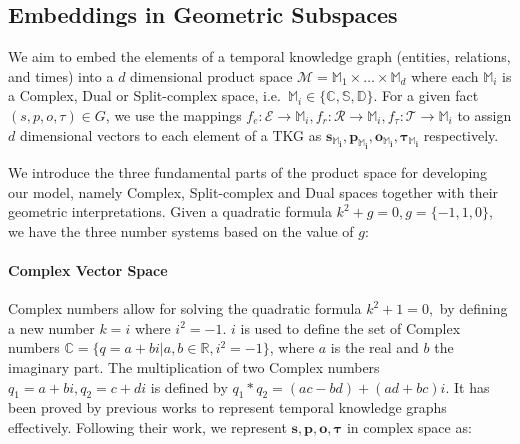 \documentclass[letterpaper]{article} %
\begin{document}
\subsection{\textbf{Embeddings in Geometric Subspaces}}
We aim to embed the elements of a temporal knowledge graph (entities, relations, and times) into a $d$ dimensional product space $\mathcal{M} = \mathbb{M}_1 \times \ldots \times \mathbb{M}_d$ where each $\mathbb{M}_i$ is a Complex, Dual or Split-complex space,
i.e.\ $\mathbb{M}_i \in \{ \mathbb{C}, \mathbb{S}, \mathbb{D} \}$.
For a given fact $(s,p,o,\tau)\in G$, we use the mappings $f_e: \mathcal{E} \xrightarrow{} \mathbb{M}_i, f_r: \mathcal{R} \xrightarrow{} \mathbb{M}_i, f_{\tau}: \mathcal{T} \xrightarrow{} \mathbb{M}_i$ to assign $d$ dimensional vectors to each element of a TKG as $\boldsymbol{s_{\mathbb{M}_i},p_{\mathbb{M}_i},o_{\mathbb{M}_i}, \tau_{\mathbb{M}_i}}$ respectively.

We introduce the three fundamental parts of the product space for developing our model, namely Complex, Split-complex and Dual spaces together with their geometric interpretations.
Given a quadratic formula $k^2 + g = 0, g = \{-1, 1, 0\}$, we have the three number systems based on the value of $g$:

\paragraph{\textbf{Complex Vector Space}}
Complex numbers \cite{harkin2004geometry,metahelzer2000special} allow for solving the quadratic formula $k^2 + 1 = 0,$ by defining a new number $k = i$ where $i^2 = -1$.
$i$ is used to define the set of Complex numbers $\mathbb{C} = \{q = a + b i | a, b \in \mathbb{R}, i^2 = -1\}$, where $a$ is the real and $b$ the imaginary part. The multiplication of two Complex numbers $q_1= a+bi, q_2=c+di$ is defined by $q_1 * q_2 = (ac- bd) + (ad + bc) i$. It has been proved by previous works \cite{tltcomplexzhang2022along,tcomplexlacroix2020tensor,xu2020tero} to represent temporal knowledge graphs effectively. Following their work, we represent $\boldsymbol{s,p,o, \tau}$ in complex space as:
\end{document}
